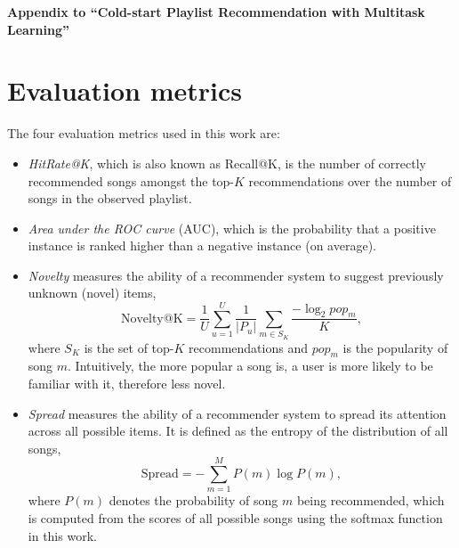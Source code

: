 \appendix
\begin{center}
  {\Large\bf Appendix to ``Cold-start Playlist Recommendation with Multitask Learning''}
\end{center}
\rule{0pt}{50pt}





\clearpage
\newpage

\section{Evaluation metrics}
The four evaluation metrics used in this work are:
\begin{itemize}
\item \emph{HitRate@K}, which is also known as Recall@K, is the number of correctly recommended songs amongst the top-$K$ recommendations over
      the number of songs in the observed playlist.
\item \emph{Area under the ROC curve} (AUC), which is the probability that a positive instance is ranked higher than a negative instance (on average).
\item \emph{Novelty} measures the ability of a recommender system to suggest previously unknown (\ie novel) items,
      $$
      \text{Novelty@K} = \frac{1}{U} \sum_{u=1}^U \frac{1}{|P_u|} \sum_{m \in S_K} \frac{-\log_2 pop_m}{K},
      $$
      where $S_K$ is the set of top-$K$ recommendations and $pop_m$ is the popularity of song $m$.
      Intuitively, the more popular a song is, a user is more likely to be familiar with it, therefore less novel.
\item \emph{Spread} measures the ability of a recommender system to spread its attention across all possible items.
      It is defined as the entropy of the distribution of all songs,
      $$
      \text{Spread} = -\sum_{m=1}^M P(m) \log P(m),
      $$
      where $P(m)$ denotes the probability of song $m$ being recommended,
      which is computed from the scores of all possible songs using the softmax function in this work.
\end{itemize}


\clearpage
\newpage
\twocolumn


